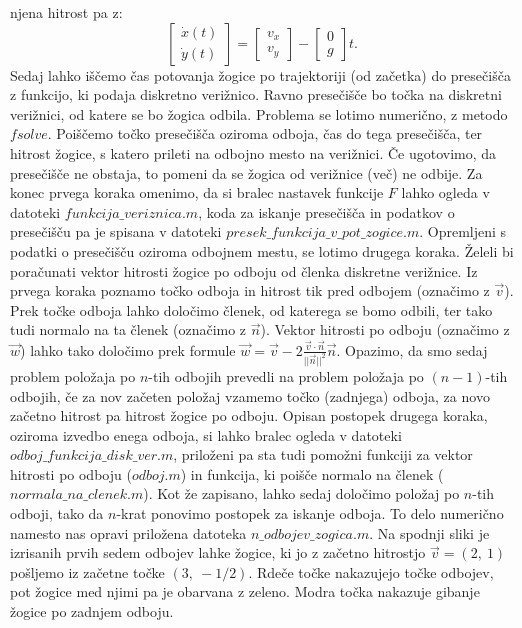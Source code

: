 \documentclass{article}
\begin{document}
njena hitrost pa z:
$$
\begin{bmatrix}
    \dot{x}(t) \\
    \dot{y}(t)
\end{bmatrix} =
\begin{bmatrix}
    v_x \\
    v_y
\end{bmatrix} - 
\begin{bmatrix}
    0\\
    g
\end{bmatrix} t.
$$
Sedaj lahko iščemo čas potovanja žogice po trajektoriji (od začetka) do presečišča z funkcijo, ki podaja diskretno verižnico. Ravno presečišče bo točka na diskretni verižnici, od katere se bo žogica odbila. 
Problema se lotimo numerično, z metodo $fsolve$. Poiščemo točko presečišča oziroma odboja, čas do tega presečišča, ter hitrost žogice, s katero prileti na odbojno mesto na verižnici. 
Če ugotovimo, da presečišče ne obstaja, to pomeni da se žogica od verižnice (več) ne odbije.
\newline
Za konec prvega koraka omenimo, da si bralec nastavek funkcije $F$ lahko ogleda v datoteki $funkcija\_veriznica.m$, koda za iskanje presečišča in podatkov o presečišču pa je spisana v datoteki $presek\_funkcija\_v\_pot\_zogice.m$.
\newline
\newline
Opremljeni s podatki o presečišču oziroma odbojnem mestu, se lotimo drugega koraka. 
Želeli bi poračunati vektor hitrosti žogice po odboju od členka diskretne verižnice. Iz prvega koraka poznamo točko odboja in hitrost tik pred odbojem (označimo z $\vec{v}$). Prek točke odboja lahko določimo členek, od katerega se bomo odbili, ter tako tudi normalo na ta členek (označimo z $\vec{n}$).
Vektor hitrosti po odboju (označimo z $\vec{w}$) lahko tako določimo prek formule $\vec{w} = \vec{v} - 2 \frac{\vec{v} \cdot \vec{n}}{||\vec{n}||^2} \vec{n}$.
\newline
Opazimo, da smo sedaj problem položaja po $n$-tih odbojih prevedli na problem položaja po $(n-1)$-tih odbojih, če za nov začeten položaj vzamemo točko (zadnjega) odboja, za novo začetno hitrost pa hitrost žogice po odboju. 
\newline
Opisan postopek drugega koraka, oziroma izvedbo enega odboja, si lahko bralec ogleda v datoteki $odboj\_funkcija\_disk\_ver.m$, priloženi pa sta tudi pomožni funkciji za vektor hitrosti po odboju ($odboj.m$) in funkcija, ki poišče normalo na členek ($normala\_na\_clenek.m$).
\newline
\newline
Kot že zapisano, lahko sedaj določimo položaj po $n$-tih odboji, tako da $n$-krat ponovimo postopek za iskanje odboja. To delo numerično namesto nas opravi priložena datoteka $n\_odbojev\_zogica.m$.
\newline
\newline
Na spodnji sliki je izrisanih prvih sedem odbojev lahke žogice, ki jo z začetno hitrostjo $\vec{v} = (2,~1)$ pošljemo iz začetne točke $(3, ~-1/2)$.
Rdeče točke nakazujejo točke odbojev, pot žogice med njimi pa je obarvana z zeleno. Modra točka nakazuje gibanje žogice po zadnjem odboju.
\end{document}
